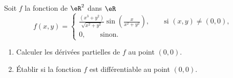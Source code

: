 \begin{exercice}\label{exocontrolecontinu0009}
  
Soit $f$ la fonction de $\eR^2$ dans $\eR$  
\begin{equation}
  f(x,y)=\begin{cases}
    \frac{(x^3+y^2)}{\sqrt{x^2+y^2}}\sin\left(\frac{x}{x^2+y^2}\right), \qquad\textrm{si } (x,y)\neq (0,0),\\
   0,  \qquad \textrm{sinon.}
  \end{cases}
\end{equation}
\begin{enumerate}
\item Calculer les dérivées partielles de $f$ au point $(0,0)$.
\item Établir si la fonction $f$ est différentiable au point $(0,0)$. 
\end{enumerate}
\end{exercice}
